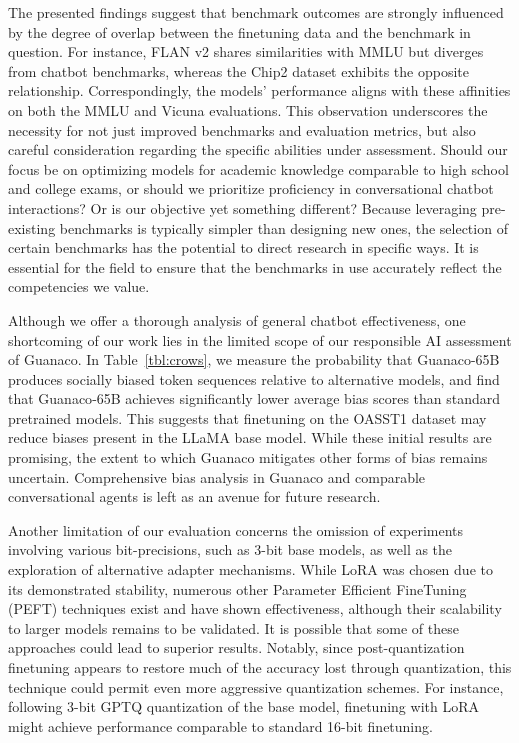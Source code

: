 The presented findings suggest that benchmark outcomes are strongly influenced by the degree of overlap between the finetuning data and the benchmark in question. For instance, FLAN v2 shares similarities with MMLU but diverges from chatbot benchmarks, whereas the Chip2 dataset exhibits the opposite relationship. Correspondingly, the models’ performance aligns with these affinities on both the MMLU and Vicuna evaluations. This observation underscores the necessity for not just improved benchmarks and evaluation metrics, but also careful consideration regarding the specific abilities under assessment. Should our focus be on optimizing models for academic knowledge comparable to high school and college exams, or should we prioritize proficiency in conversational chatbot interactions? Or is our objective yet something different? Because leveraging pre-existing benchmarks is typically simpler than designing new ones, the selection of certain benchmarks has the potential to direct research in specific ways. It is essential for the field to ensure that the benchmarks in use accurately reflect the competencies we value.

Although we offer a thorough analysis of general chatbot effectiveness, one shortcoming of our work lies in the limited scope of our responsible AI assessment of {Guanaco}. In Table~\ref{tbl:crows}, we measure the probability that {Guanaco}-65B produces socially biased token sequences relative to alternative models, and find that {Guanaco}-65B achieves significantly lower average bias scores than standard pretrained models. This suggests that finetuning on the OASST1 dataset may reduce biases present in the LLaMA base model. While these initial results are promising, the extent to which {Guanaco} mitigates other forms of bias remains uncertain. Comprehensive bias analysis in {Guanaco} and comparable conversational agents is left as an avenue for future research.

Another limitation of our evaluation concerns the omission of experiments involving various bit-precisions, such as 3-bit base models, as well as the exploration of alternative adapter mechanisms. While LoRA was chosen due to its demonstrated stability, numerous other Parameter Efficient FineTuning (PEFT) techniques exist and have shown effectiveness, although their scalability to larger models remains to be validated. It is possible that some of these approaches could lead to superior results. Notably, since post-quantization finetuning appears to restore much of the accuracy lost through quantization, this technique could permit even more aggressive quantization schemes. For instance, following 3-bit GPTQ quantization of the base model, finetuning with LoRA might achieve performance comparable to standard 16-bit finetuning.

